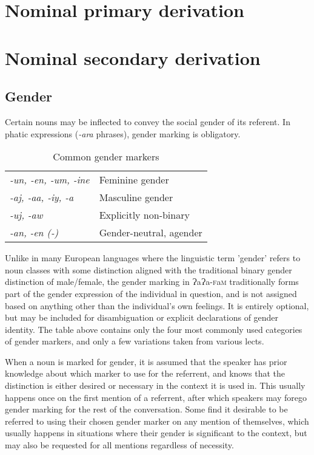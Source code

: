 \documentclass[a4paper,10pt,twoside,openright]{memoir}
\newcommand{\lang}{{\bigglot}a{\bigglot}a-\textsc{f}a\textsc{m}}
\newcommand{\bigglot}{Ɂ}
\begin{document}
\section{Nominal primary derivation}
\section{Nominal secondary derivation}
\subsection{Gender}
Certain nouns may be inflected to convey the social gender of its referent. In phatic expressions (\emph{-ara} phrases), gender marking is obligatory.

\begin{table}[ht]
    \centering
    \begin{tabular}{>{\em}ll}
    -un, -en, -um, -ine & Feminine gender \\
    -aj, -aa, -iy, -a & Masculine gender \\
    -uj, -aw & Explicitly non-binary \\
    -an, -en (-\null) & Gender-neutral, agender \\
    \end{tabular}
    \caption{Common gender markers}
\end{table}

Unlike in many European languages where the linguistic term 'gender' refers to noun classes with some distinction aligned with the traditional binary gender distinction of male/female, the gender marking in \lang{} traditionally forms part of the gender expression of the individual in question, and is not assigned based on anything other than the individual's own feelings. It is entirely optional, but may be included for disambiguation or explicit declarations of gender identity. The table above contains only the four most commonly used categories of gender markers, and only a few variations taken from various lects.

When a noun is marked for gender, it is assumed that the speaker has prior knowledge about which marker to use for the referrent, and knows that the distinction is either desired or necessary in the context it is used in. This usually happens once on the first mention of a referrent, after which speakers may forego gender marking for the rest of the conversation. Some find it desirable to be referred to using their chosen gender marker on any mention of themselves, which usually happens in situations where their gender is significant to the context, but may also be requested for all mentions regardless of necessity.
\end{document}
